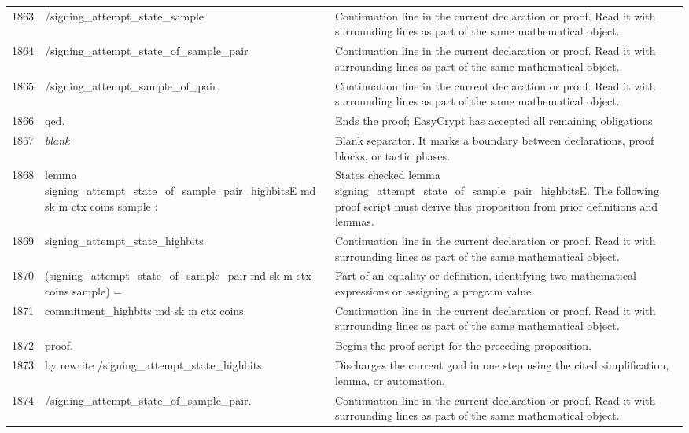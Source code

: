 \documentclass[10pt]{article}
\begin{document}
\begin{longtable}{r L{0.53\textwidth} L{0.37\textwidth}}
1863 & {\ttfamily\scriptsize            /signing\_attempt\_state\_sample} & Continuation line in the current declaration or proof.  Read it with surrounding lines as part of the same mathematical object. \\
1864 & {\ttfamily\scriptsize            /signing\_attempt\_state\_of\_sample\_pair} & Continuation line in the current declaration or proof.  Read it with surrounding lines as part of the same mathematical object. \\
1865 & {\ttfamily\scriptsize            /signing\_attempt\_sample\_of\_pair.} & Continuation line in the current declaration or proof.  Read it with surrounding lines as part of the same mathematical object. \\
1866 & {\ttfamily\scriptsize qed.} & Ends the proof; EasyCrypt has accepted all remaining obligations. \\
1867 & {\ttfamily\scriptsize \emph{blank}} & Blank separator.  It marks a boundary between declarations, proof blocks, or tactic phases. \\
1868 & {\ttfamily\scriptsize lemma signing\_attempt\_state\_of\_sample\_pair\_highbitsE md sk m ctx coins sample :} & States checked lemma signing\_attempt\_state\_of\_sample\_pair\_highbitsE.  The following proof script must derive this proposition from prior definitions and lemmas. \\
1869 & {\ttfamily\scriptsize   signing\_attempt\_state\_highbits} & Continuation line in the current declaration or proof.  Read it with surrounding lines as part of the same mathematical object. \\
1870 & {\ttfamily\scriptsize     (signing\_attempt\_state\_of\_sample\_pair md sk m ctx coins sample) =} & Part of an equality or definition, identifying two mathematical expressions or assigning a program value. \\
1871 & {\ttfamily\scriptsize   commitment\_highbits md sk m ctx coins.} & Continuation line in the current declaration or proof.  Read it with surrounding lines as part of the same mathematical object. \\
1872 & {\ttfamily\scriptsize proof.} & Begins the proof script for the preceding proposition. \\
1873 & {\ttfamily\scriptsize by rewrite /signing\_attempt\_state\_highbits} & Discharges the current goal in one step using the cited simplification, lemma, or automation. \\
1874 & {\ttfamily\scriptsize            /signing\_attempt\_state\_of\_sample\_pair.} & Continuation line in the current declaration or proof.  Read it with surrounding lines as part of the same mathematical object. \\

\end{longtable}
\end{document}
